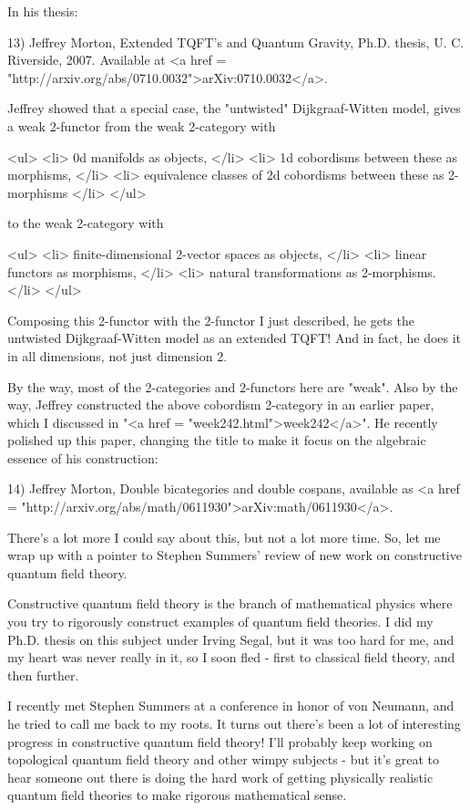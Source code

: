 In his thesis:

13) Jeffrey Morton, Extended TQFT's and Quantum Gravity, Ph.D.
thesis, U. C. Riverside, 2007.  Available at <a href = "http://arxiv.org/abs/0710.0032">arXiv:0710.0032</a>.

Jeffrey showed that a special case, the "untwisted"
Dijkgraaf-Witten model, gives a weak 2-functor from the weak
2-category with

<ul>
<li>
0d manifolds as objects,
</li>
<li>
1d cobordisms between these as morphisms,
</li>
<li>
equivalence classes of 2d cobordisms between these as 2-morphisms
</li>
</ul>

to the weak 2-category with

<ul>
<li>
finite-dimensional 2-vector spaces as objects,
</li>
<li>
linear functors as morphisms,
</li>
<li>
natural transformations as 2-morphisms.
</li>
</ul>

Composing this 2-functor with the 2-functor I just described, 
he gets the untwisted Dijkgraaf-Witten model as an extended TQFT!
And in fact, he does it in all dimensions, not just dimension 2.

By the way, most of the 2-categories and 2-functors here are "weak".
Also by the way, Jeffrey constructed the above cobordism 2-category in
an earlier paper, which I discussed in "<a href =
"week242.html">week242</a>".  He recently polished up this paper,
changing the title to make it focus on the algebraic essence of his
construction:

14) Jeffrey Morton, Double bicategories and double cospans,
available as <a href = "http://arxiv.org/abs/math/0611930">arXiv:math/0611930</a>.

There's a lot more I could say about this, but not a lot more time.
So, let me wrap up with a pointer to Stephen Summers' review of new
work on constructive quantum field theory.  

Constructive quantum field theory is the branch of mathematical
physics where you try to rigorously construct examples of quantum
field theories.  I did my Ph.D. thesis on this subject under Irving
Segal, but it was too hard for me, and my heart was never really in
it, so I soon fled - first to classical field theory, and then
further.

I recently met Stephen Summers at a conference in honor of von
Neumann, and he tried to call me back to my roots.  It turns out
there's been a lot of interesting progress in constructive quantum
field theory!  I'll probably keep working on topological quantum field
theory and other wimpy subjects - but it's great to hear someone out
there is doing the hard work of getting physically realistic quantum
field theories to make rigorous mathematical sense.

